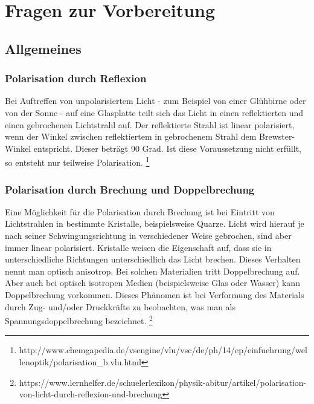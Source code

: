 

\chapter{Fragen zur Vorbereitung}
\label{chap:fvz}


\section{Allgemeines}

\subsection*{Polarisation durch Reflexion}
Bei Auftreffen von unpolarisiertem Licht - zum Beispiel von einer Glühbirne oder von der Sonne - auf eine Glasplatte teilt sich das Licht in einen reflektierten und einen gebrochenen Lichtstrahl auf. 
Der reflektierte Strahl ist  linear polarisiert, wenn der Winkel zwischen reflektiertem in gebrochenem Strahl dem Brewster-Winkel entspricht. Dieser beträgt 90 Grad. Ist diese Voraussetzung nicht erfüllt, so entsteht nur teilweise Polarisation. 
\footnote{http://www.chemgapedia.de/vsengine/vlu/vsc/de/ph/14/ep/einfuehrung/wellenoptik/polarisation_b.vlu.html}

\subsection*{Polarisation durch Brechung und Doppelbrechung}
Eine Möglichkeit für die Polarisation durch Brechung ist bei Eintritt von Lichtstrahlen in bestimmte Kristalle, beispielsweise Quarze. Licht wird hierauf je nach seiner Schwingungsrichtung in verschiedener Weise gebrochen, sind aber immer linear polarisiert. 
Kristalle weisen die Eigenschaft auf, dass sie in unterschiedliche Richtungen unterschiedlich das Licht brechen. Dieses Verhalten nennt man optisch anisotrop. Bei solchen Materialien tritt Doppelbrechung auf. Aber auch bei optisch isotropen Medien (beispielsweise Glas oder Wasser) kann Doppelbrechung vorkommen. Dieses Phänomen ist  bei Verformung des Materials durch Zug- und/oder Druckkräfte zu beobachten, was man als Spannungsdoppelbrechung bezeichnet. 
\footnote{https://www.lernhelfer.de/schuelerlexikon/physik-abitur/artikel/polarisation-von-licht-durch-reflexion-und-brechung}

